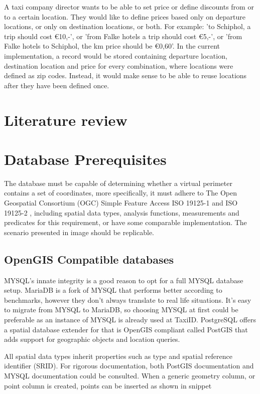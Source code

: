 A taxi company director wants to be able to set price or define discounts from or to a certain location. They would like to define prices based only on departure locations, or only on destination locations, or both. For example: 'to Schiphol, a trip should cost \euro 10,-', or 'from Falke hotels a trip should cost \euro 5,-', or 'from Falke hotels to Schiphol, the km price should be \euro 0,60'. In the current implementation, a record would be stored containing departure location, destination location and price for every combination, where locations were defined as zip codes. Instead, it would make sense to be able to reuse locations after they have been defined once.

\section{Literature review}


\section{Database Prerequisites}

The database must be capable of determining whether a virtual perimeter contains a set of coordinates, more specifically, it must adhere to The Open Geospatial Consortium (OGC) Simple Feature Access ISO 19125-1  and ISO 19125-2 , including spatial data types, analysis functions, measurements and predicates for this requirement, or have some comparable implementation. The scenario presented in image  should be replicable.

\subsection{OpenGIS Compatible databases}

MYSQL’s innate integrity is a good reason to opt for a full MYSQL database setup. MariaDB is a fork of MYSQL that performs better according to benchmarks, however they don’t always translate to real life situations. It’s easy to migrate from MYSQL to MariaDB, so choosing MYSQL at first could be preferable as an instance of MYSQL is already used at TaxiID. PostgreSQL offers a spatial database extender for that is OpenGIS compliant called PostGIS that adds support for geographic objects and location queries.

All spatial data types inherit properties such as type and spatial reference identifier (SRID). For rigorous documentation, both PostGIS documentation  and MYSQL documentation  could be consulted. When a generic geometry column, or point column is created, points can be inserted as shown in snippet 

